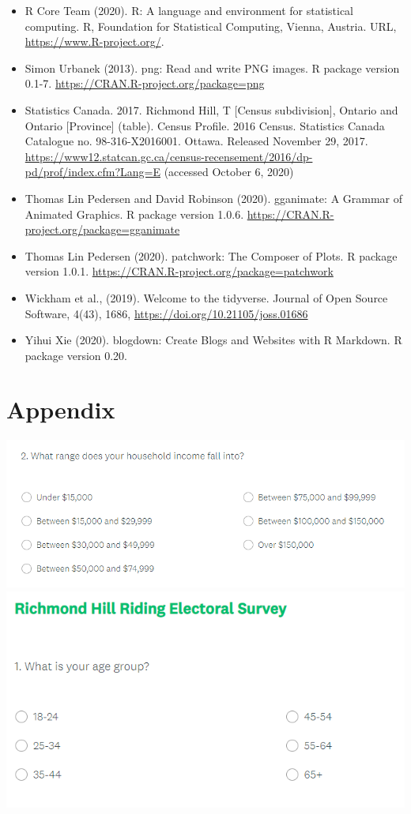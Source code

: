 \documentclass[
]{article}
\begin{document}
\begin{itemize}
\item
  R Core Team (2020). R: A language and environment for statistical
  computing. R, Foundation for Statistical Computing, Vienna, Austria.
  URL, \url{https://www.R-project.org/}.
\item
  Simon Urbanek (2013). png: Read and write PNG images. R package
  version 0.1-7. \url{https://CRAN.R-project.org/package=png}
\item
  Statistics Canada. 2017. Richmond Hill, T {[}Census subdivision{]},
  Ontario and Ontario {[}Province{]} (table). Census Profile. 2016
  Census. Statistics Canada Catalogue no. 98-316-X2016001. Ottawa.
  Released November 29, 2017.
  \url{https://www12.statcan.gc.ca/census-recensement/2016/dp-pd/prof/index.cfm?Lang=E}
  (accessed October 6, 2020)
\item
  Thomas Lin Pedersen and David Robinson (2020). gganimate: A Grammar of
  Animated Graphics. R package version 1.0.6.
  \url{https://CRAN.R-project.org/package=gganimate}
\item
  Thomas Lin Pedersen (2020). patchwork: The Composer of Plots. R
  package version 1.0.1.
  \url{https://CRAN.R-project.org/package=patchwork}
\item
  Wickham et al., (2019). Welcome to the tidyverse. Journal of Open
  Source Software, 4(43), 1686,
  \url{https://doi.org/10.21105/joss.01686}
\item
  Yihui Xie (2020). blogdown: Create Blogs and Websites with R Markdown.
  R package version 0.20.
\end{itemize}

\hypertarget{appendix}{%
\section{Appendix}\label{appendix}}

\includegraphics{img/income_range.png}
\includegraphics{img/age_range.png}
\end{document}
